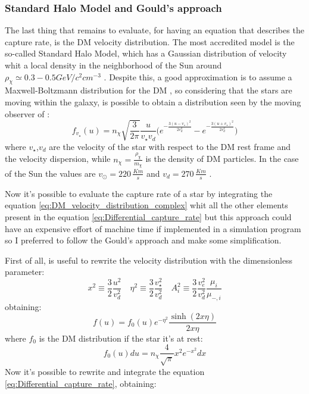 \subsubsection{Standard Halo Model and Gould's approach}
The last thing that remains to evaluate, for having an equation that describes the capture rate, is the DM velocity distribution. The most accredited model is the so-called Standard Halo Model, which has a Gaussian distribution of velocity whit a local density in the neighborhood of the Sun around $\rho_{\chi}\simeq 0.3-0.5 GeV/c^2 cm^{-3}$ \cite{evans2018shm}. Despite this, a good approximation is to assume a Maxwell-Boltzmann distribution for the DM \cite{DMSun, Gould:1987ir}, so considering that the stars are moving within the galaxy, is possible to obtain a distribution seen by the moving observer of \cite{DMSun}:
\begin{equation}
\label{eq:DM_velocity_distribution_complex}
    f_{v_{\star}}(u)= n_{\chi}\sqrt{\frac{3}{2\pi}}\frac{u}{v_{\star}v_d}\Big(e^{-\frac{3(u-v_{\star})^2}{2v_d^2}}-e^{-\frac{3(u+v_{\star})^2}{2v_d^2}}\Big)
\end{equation}
where $v_{\star}$,$v_d$ are the velocity of the star with respect to the DM rest frame and the velocity dispersion, while $n_{\chi}=\frac{\rho_{\chi}}{m_{\chi}}$ is the density of DM particles. In the case of the Sun the values are  $v_{\odot}= 220\, \frac{Km}{s}$ and $v_d= 270 \, \frac{Km}{s}$ \cite{DMSun}. 

Now it's possible to evaluate the capture rate of a star by integrating the equation \ref{eq:DM_velocity_distribution_complex} whit all the other elements present in the equation \ref{eq:Differential_capture_rate} but this approach could have an expensive effort of machine time if implemented in a simulation program so I preferred to follow the Gould's approach \cite{Gould:1987ir, Bottino_2002} and make some simplification. 

First of all, is useful to rewrite the velocity distribution with the dimensionless parameter:
\begin{equation*}
    x^2\equiv \frac{3}{2} \frac{u^2}{v_d^2} \quad \eta^2\equiv \frac{3}{2}\frac{v_{\star}^2}{v_d^2} \quad
    A_i^2\equiv \frac{3}{2}\frac{v_e^2}{v_d^2}\frac{\mu_i}{\mu_{-,i}}
\end{equation*}
obtaining\cite{Gould:1987ir}:
\begin{equation*}
    f(u)=f_0(u) e^{-\eta^2}\frac{\sinh(2x\eta)}{2x\eta}
\end{equation*}
where $f_0$ is the DM distribution if the star it's at rest:
\begin{equation*}
    f_0(u)du=n_{\chi}\frac{4}{\sqrt{\pi}}x^2e^{-x^2}dx
\end{equation*}
Now it's possible to rewrite and integrate the equation \ref{eq:Differential_capture_rate}, obtaining\cite{Gould:1987ir, Bottino_2002}:

